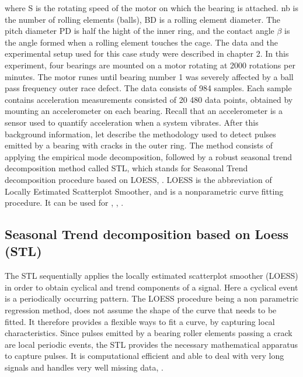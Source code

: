 \documentclass[../Main/thesis.tex]{subfiles}
\begin{document}
where S is the rotating speed of the motor on which the bearing is attached. nb is the number of rolling elements (balls), BD is a rolling element diameter. The pitch diameter PD is half the hight of the inner ring, and the contact angle $\beta$ is the angle formed when a rolling element touches the cage. The data and the experimental setup used for this case study were described in chapter 2. In this experiment, four bearings are mounted on a motor rotating at 2000 rotations per minutes. The motor runes until bearing number 1 was severely affected by a ball pass frequency outer race defect. The data consists of 984 samples. Each sample contains  acceleration measurements consisted of 20 480 data points, obtained by mounting an accelerometer on each bearing. Recall that an accelerometer is a sensor used to quantify acceleration when a system vibrates. After this background information, let describe the methodology used to detect pulses emitted by a bearing with cracks in the outer ring.
\justify
The method consists of applying the empirical mode decomposition, followed by a robust seasonal trend decomposition method called STL, which stands for Seasonal Trend decomposition procedure based on LOESS,  \cite{Cleveland-et-al-1990}. LOESS is the abbreviation of Locally Estimated Scatterplot Smoother, and is a nonparametric curve fitting procedure. It can be used for , \cite{Cleveland-1979}, \cite{Cleveland-et-al-1988}.
\justify
\subsection{Seasonal Trend decomposition based on Loess (STL)}
The STL sequentially applies the locally estimated scatterplot smoother (LOESS) in order to obtain cyclical and trend components of a signal. Here a cyclical event is a periodically occurring pattern. The LOESS procedure being a non parametric regression method, does not assume the shape of the curve that needs to be fitted. It therefore provides a flexible ways to fit a curve, by capturing local characteristics. Since pulses emitted by a bearing roller elements passing a crack are local periodic events, the STL provides the necessary mathematical apparatus to capture pulses. It is computational efficient and able to deal with very long signals and handles very well missing data, \cite{Cleveland-et-al-1990}.

 







\blankpage
\end{document}
